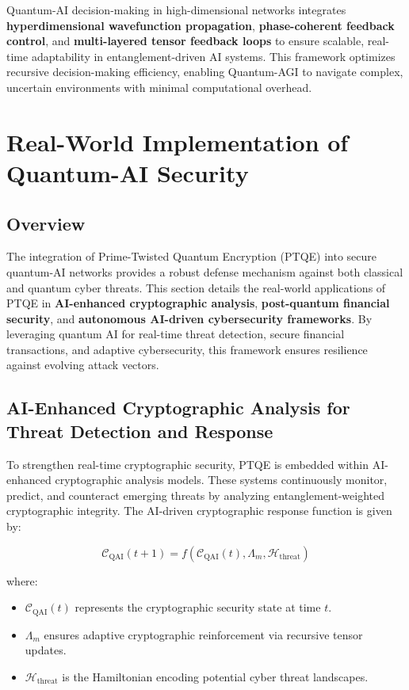 \documentclass{article}
\theoremstyle{plain}
\begin{document}
\begin{itemize}
Quantum-AI decision-making in high-dimensional networks integrates \textbf{hyperdimensional wavefunction propagation}, \textbf{phase-coherent feedback control}, and \textbf{multi-layered tensor feedback loops} to ensure scalable, real-time adaptability in entanglement-driven AI systems. This framework optimizes recursive decision-making efficiency, enabling Quantum-AGI to navigate complex, uncertain environments with minimal computational overhead.

\section{Real-World Implementation of Quantum-AI Security}

\subsection{Overview}

The integration of Prime-Twisted Quantum Encryption (PTQE) into secure quantum-AI networks provides a robust defense mechanism against both classical and quantum cyber threats. This section details the real-world applications of PTQE in \textbf{AI-enhanced cryptographic analysis}, \textbf{post-quantum financial security}, and \textbf{autonomous AI-driven cybersecurity frameworks}. By leveraging quantum AI for real-time threat detection, secure financial transactions, and adaptive cybersecurity, this framework ensures resilience against evolving attack vectors.

\subsection{AI-Enhanced Cryptographic Analysis for Threat Detection and Response}

To strengthen real-time cryptographic security, PTQE is embedded within AI-enhanced cryptographic analysis models. These systems continuously monitor, predict, and counteract emerging threats by analyzing entanglement-weighted cryptographic integrity. The AI-driven cryptographic response function is given by:

\begin{equation}
    \mathcal{C}_{\text{QAI}}(t+1) = f(\mathcal{C}_{\text{QAI}}(t), \Lambda_m, \mathcal{H}_{\text{threat}})
\end{equation}

where:
\begin{itemize}
    \item \( \mathcal{C}_{\text{QAI}}(t) \) represents the cryptographic security state at time \( t \).
    \item \( \Lambda_m \) ensures adaptive cryptographic reinforcement via recursive tensor updates.
    \item \( \mathcal{H}_{\text{threat}} \) is the Hamiltonian encoding potential cyber threat landscapes.
\end{itemize}


\end{itemize}
\end{document}
